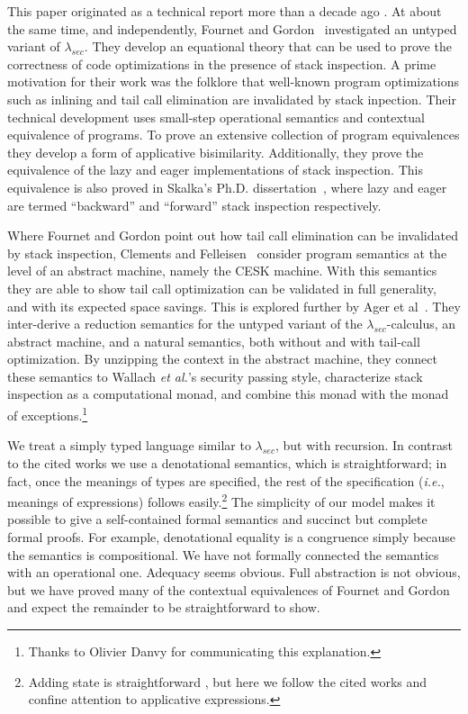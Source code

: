 \documentclass[submission,copyright,creativecommons]{eptcs}
\newcommand{\ie}{{\em i.e.}}
\begin{document}
This paper originated as a technical report more than a decade ago \cite{tr2001-1}.
At about the same time, and independently, Fournet and Gordon~\cite{FournetG03} 
investigated an untyped variant of $\lambda_{\mathit{sec}}$. They develop an equational theory that can be used to prove the correctness of code optimizations in the presence of stack inspection. A prime motivation for their work was the folklore that well-known program optimizations such as inlining and tail call elimination are invalidated by stack inpection. Their technical development uses small-step operational semantics and contextual equivalence of programs.
To prove an extensive collection of program equivalences they develop a form of applicative bisimilarity. Additionally, they prove the equivalence of the lazy and eager implementations of stack inspection. This equivalence is also proved in Skalka's Ph.D. dissertation~\cite[Theorem 4.1, Chapter 4]{skalka:phd}, where lazy and eager are termed ``backward'' and ``forward'' stack inspection respectively.





Where Fournet and Gordon point out how tail call elimination can be invalidated by stack inspection, Clements and Felleisen~\cite{ClementsF04}
consider program semantics at the level of an abstract machine, namely the 
CESK machine. With this semantics they are able to show tail call optimization can be validated in full generality, and with its expected space savings. This is explored further by Ager et al~\cite{Ager05afunctional}.
They inter-derive a reduction semantics for the untyped
variant of the $\lambda_{\mathit{sec}}$-calculus, an abstract machine,
and a natural semantics, both without and with tail-call optimization.
By unzipping the context in the abstract machine, they connect these
semantics to Wallach \emph{et al.}'s security passing
style, characterize stack inspection as a
computational monad, and combine this monad with the monad of
exceptions.\footnote{Thanks to Olivier Danvy for communicating this explanation.}

We treat a simply typed language similar to $\lambda_{\mathit{sec}}$, but with recursion.
In contrast to the cited works we use a denotational semantics, which is 
straightforward; 
in fact, once the meanings
of types are specified, the rest of the specification (\ie, meanings of
expressions) follows easily.\footnote{Adding state is straightforward \cite{BanerjeeNaumann02a}, but here  we follow the cited works and confine attention to applicative expressions.}
The simplicity of our model makes it
possible to give a self-contained formal semantics and succinct but complete formal
proofs.  For example, denotational equality is a congruence simply because the semantics is compositional.
We have not formally connected the semantics with an operational one.
Adequacy seems obvious. Full abstraction is not obvious, but we have proved many of the contextual equivalences of Fournet and Gordon~\cite{FournetG03} and expect the remainder to be straightforward to show.
\end{document}
